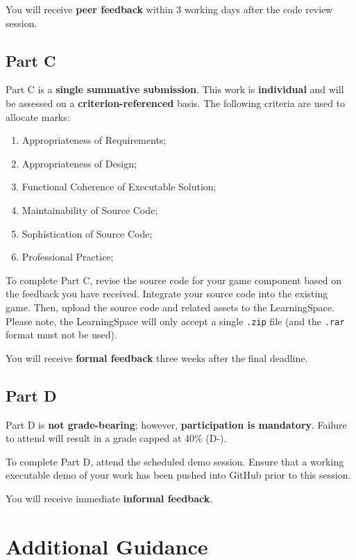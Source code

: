 \documentclass{../fal_assignment}
\begin{document}
You will receive \textbf{peer feedback} within 3 working days after the code review session.

\subsection*{Part C}

Part C is a \textbf{single summative submission}. This work is \textbf{individual} and will be assessed on a \textbf{criterion-referenced} basis. The following criteria are used to allocate marks:

\begin{enumerate}[label=(\alph*)]
	\item Appropriateness of Requirements;
	\item Appropriateness of Design;
	\item Functional Coherence of Executable Solution;
	\item Maintainability of Source Code;
	\item Sophistication of Source Code;
	\item Professional Practice;
\end{enumerate}

To complete Part C, revise the source code for your game component based on the feedback you have received. Integrate your source code into the existing game. Then, upload the source code and related assets to the LearningSpace. Please note, the LearningSpace will only accept a single \texttt{.zip} file (and the \texttt{.rar} format must not be used).

You will receive \textbf{formal feedback} three weeks after the final deadline.

\subsection*{Part D}

Part D is \textbf{not grade-bearing}; however, \textbf{participation is mandatory}. Failure to attend will result in a grade capped at 40\% (D-).

To complete Part D, attend the scheduled demo session. Ensure that a working executable demo of your work has been pushed into GitHub prior to this session. 

You will receive immediate \textbf{informal feedback}.

\section*{Additional Guidance}
\end{document}
